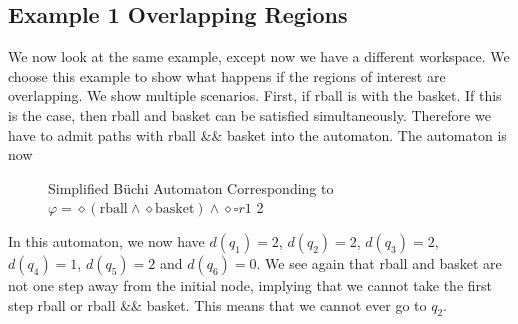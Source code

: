\subsection{Example 1 Overlapping Regions}
We now look at the same example, except now we have a different workspace. We choose this example to show what happens if the regions of interest are overlapping. We show multiple scenarios. First, if rball is with the basket. If this is the case, then rball and basket can be satisfied simultaneously. Therefore we have to admit paths with rball \&\& basket into the automaton. The automaton is now
\begin{figure}
\centering
{}
\caption{Simplified B\"uchi Automaton Corresponding to $\varphi = \diamond (\text{rball} \wedge \diamond \text{basket}) \wedge \diamond \square r1$ 2}
\label{fig:ex1OverlapSimplifiedBuchi}
\end{figure} 

In this automaton, we now have $d(q_1)=2$, $d(q_2)=2$, $d(q_3)=2$, $d(q_4)=1$, $d(q_5) = 2$ and $d(q_6)=0$. We see again that rball and basket are not one step away from the initial node, implying that we cannot take the first step rball or rball \&\& basket. This means that we cannot ever go to $q_2$.

